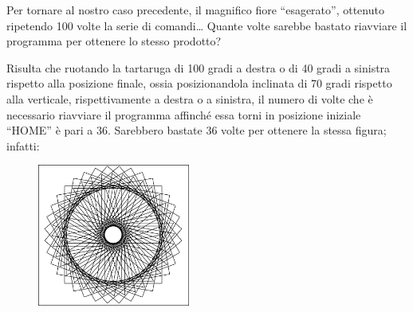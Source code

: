Per tornare al nostro caso precedente, il magnifico fiore “esagerato”, ottenuto
ripetendo 100 volte la serie di comandi… Quante volte sarebbe bastato riavviare
il programma per ottenere lo stesso prodotto?

Risulta che ruotando la tartaruga di 100 gradi a destra o di 40 gradi a
sinistra rispetto alla posizione finale, ossia posizionandola inclinata di 70
gradi rispetto alla verticale, rispettivamente a destra o a sinistra, il numero
di volte che è necessario riavviare il programma affinché essa torni in
posizione iniziale “HOME” è pari a 36. Sarebbero bastate 36 volte per ottenere
la stessa figura; infatti:

\begin{minipage}{0.5\textwidth}
\begin{figure}[H]
   \includegraphics[width=5.0cm,trim=4 4 6 4,clip]{./images/marta/mar-11.png}
   \label{mar-13}
\end{figure}
\end{minipage} \hfill
